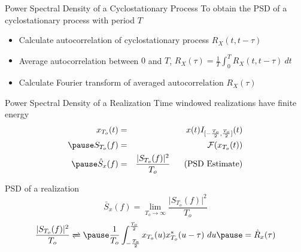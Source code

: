 \documentclass[t]{beamer}
\begin{document}
\begin{frame}{Power Spectral Density of a Cyclostationary Process}
  \footnotesize
  To obtain the PSD of a cyclostationary process with period $T$
  \pause
  \begin{itemize}
    \item Calculate autocorrelation of cyclostationary process $R_X(t,t-\tau)$
    \pause
    \item Average autocorrelation between $0$ and $T$, $R_X(\tau) = \frac{1}{T} \int_0^T R_X(t,t-\tau) \ dt$
    \pause
    \item Calculate Fourier transform of averaged autocorrelation $R_X(\tau)$
  \end{itemize}
  \normalsize
\end{frame}

\begin{frame}{Power Spectral Density of a Realization}
  \footnotesize
  Time windowed realizations have finite energy
    \begin{eqnarray*}
      x_{T_o}(t) & = & x(t)I_{[-\frac{T_o}{2},\frac{T_o}{2}]}(t) \\
      \pause
      S_{T_o}(f) & = & \mathcal{F}(x_{T_o}(t)) \\
      \pause
      \hat{S}_x(f) & = & \frac{\lvert S_{T_o}(f) \rvert^2}{T_o} \ \ \ \ \text{ (PSD Estimate)}
    \end{eqnarray*}
  \pause
  \begin{block}{PSD of a realization}
    \begin{equation*}
    \bar{S}_x(f) = \lim_{T_o \rightarrow \infty} \frac{\lvert S_{T_o}(f) \rvert^2}{T_o}
    \end{equation*}
    \pause
    \begin{equation*}
\frac{\lvert S_{T_o}(f) \rvert^2}{T_o}  \xrightleftharpoons{}  \pause\frac{1}{T_o} \int_{-\frac{T_o}{2}}^{\frac{T_o}{2}} x_{T_o}(u)x_{T_o}^*(u-\tau) \ du \pause =\hat{R}_x(\tau)  
    \end{equation*}
  \end{block}
  \normalsize
\end{frame}
\end{document}
